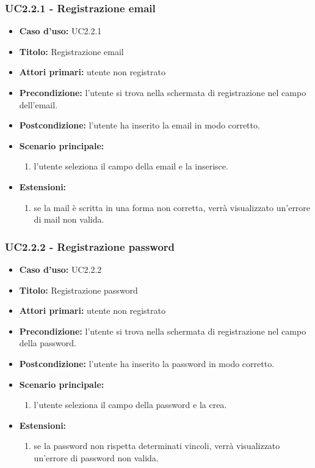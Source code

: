 \documentclass[casi-duso]{subfiles}
\begin{document}
\subsubsection{UC2.2.1 - Registrazione email}
\label{subsub:uc2.2.1utente}
\begin{itemize}
  \item \textbf{Caso d’uso:} UC2.2.1 
  \item \textbf{Titolo:} Registrazione email
  \item \textbf{Attori primari:} utente non registrato
  \item \textbf{Precondizione:} l'utente si trova nella schermata di registrazione nel campo dell'email.
  \item \textbf{Postcondizione:} l'utente ha inserito la email in modo corretto. 
  \item \textbf{Scenario principale:} 
  \begin{enumerate}
    \item l'utente seleziona il campo della email e la inserisce.
  \end{enumerate}
  \item \textbf{Estensioni:} 
  \begin{enumerate}
    \item se la mail è scritta in una forma non corretta, verrà visualizzato un'errore di mail non valida.
  \end{enumerate}     
\end{itemize}

\subsubsection{UC2.2.2 - Registrazione password}
\label{subsub:uc2.2.2utente}
\begin{itemize}
  \item \textbf{Caso d’uso:} UC2.2.2 
  \item \textbf{Titolo:} Registrazione password
  \item \textbf{Attori primari:} utente non registrato
  \item \textbf{Precondizione:} l'utente si trova nella schermata di registrazione nel campo della password.
  \item \textbf{Postcondizione:} l'utente ha inserito la password in modo corretto.  
  \item \textbf{Scenario principale:} 
  \begin{enumerate}
    \item l'utente seleziona il campo della password e la crea.
  \end{enumerate}
  \item \textbf{Estensioni:} 
  \begin{enumerate}
    \item se la password non rispetta determinati vincoli, verrà visualizzato un'errore di password non valida.
  \end{enumerate}     
\end{itemize}
\end{document}
